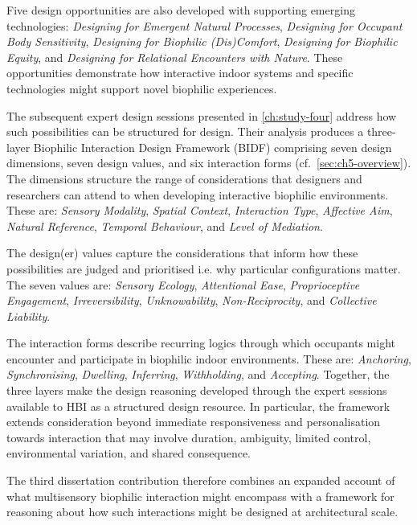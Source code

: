 Five design opportunities are also developed with supporting emerging technologies: \textit{Designing for Emergent Natural Processes}, \textit{Designing for Occupant Body Sensitivity}, \textit{Designing for Biophilic (Dis)Comfort}, \textit{Designing for Biophilic Equity}, and \textit{Designing for Relational Encounters with Nature}. These opportunities demonstrate how interactive indoor systems and specific technologies might support novel biophilic experiences.

The subsequent expert design sessions presented in \autoref{ch:study-four} address how such possibilities can be structured for design. Their analysis produces a three-layer Biophilic Interaction Design Framework (BIDF) comprising seven design dimensions, seven design values, and six interaction forms (cf.~\autoref{sec:ch5-overview}). The dimensions structure the range of considerations that designers and researchers can attend to when developing interactive biophilic environments. These are: \textit{Sensory Modality}, \textit{Spatial Context}, \textit{Interaction Type}, \textit{Affective Aim}, \textit{Natural Reference}, \textit{Temporal Behaviour}, and \textit{Level of Mediation}. 

The design(er) values capture the considerations that inform how these possibilities are judged and prioritised i.e. why particular configurations matter. The seven values are: \textit{Sensory Ecology}, \textit{Attentional Ease}, \textit{Proprioceptive Engagement}, \textit{Irreversibility}, \textit{Unknowability}, \textit{Non-Reciprocity}, and \textit{Collective Liability}.
 
The interaction forms describe recurring logics through which occupants might encounter and participate in biophilic indoor environments. These are: \textit{Anchoring}, \textit{Synchronising}, \textit{Dwelling}, \textit{Inferring}, \textit{Withholding}, and \textit{Accepting}. Together, the three layers make the design reasoning developed
through the expert sessions available to HBI as a structured design resource. In particular, the framework extends consideration beyond immediate responsiveness and personalisation towards interaction that may involve duration, ambiguity, limited control, environmental variation, and shared consequence.

The third dissertation contribution therefore combines an expanded
account of what multisensory biophilic interaction might encompass with
a framework for reasoning about how such interactions might be designed
at architectural scale.


